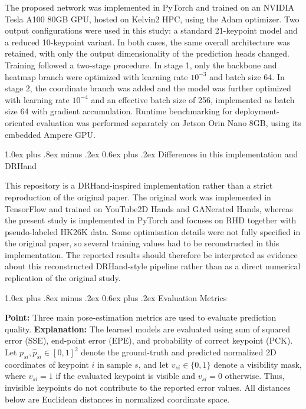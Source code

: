 \documentclass[10pt,letterpaper]{article}
\makeatletter
\renewcommand\subsection{\@startsection{subsection}{2}{\z@}%
  {1.0ex plus .8ex minus .2ex}%
  {0.6ex plus .2ex}%
  {\normalfont\itshape}}
\makeatother
\begin{document}
The proposed network was implemented in PyTorch and trained on an NVIDIA Tesla A100 80GB GPU, hosted on Kelvin2 HPC, using the Adam optimizer. Two output configurations were used in this study: a standard 21-keypoint model and a reduced 10-keypoint variant. In both cases, the same overall architecture was retained, with only the output dimensionality of the prediction heads changed. Training followed a two-stage procedure. In stage 1, only the backbone and heatmap branch were optimized with learning rate \(10^{-3}\) and batch size 64. In stage 2, the coordinate branch was added and the model was further optimized with learning rate \(10^{-4}\) and an effective batch size of 256, implemented as batch size 64 with gradient accumulation. Runtime benchmarking for deployment-oriented evaluation was performed separately on Jetson Orin Nano 8GB, using its embedded Ampere GPU.

\subsection{Differences in this implementation and DRHand}

\noindent This repository is a DRHand-inspired implementation rather than a strict reproduction of the original paper. The original work was implemented in TensorFlow and trained on YouTube2D Hands and GANerated Hands, whereas the present study is implemented in PyTorch and focuses on RHD together with pseudo-labeled HK26K data. Some optimisation details were not fully specified in the original paper, so several training values had to be reconstructed in this implementation. The reported results should therefore be interpreted as evidence about this reconstructed DRHand-style pipeline rather than as a direct numerical replication of the original study.


\subsection{Evaluation Metrics}

\noindent\textbf{Point:} Three main pose-estimation metrics are used to evaluate prediction quality.  
\textbf{Explanation:} The learned models are evaluated using sum of squared error (SSE), end-point error (EPE), and probability of correct keypoint (PCK). Let \(p_{si}, \hat{p}_{si} \in [0,1]^2\) denote the ground-truth and predicted normalized 2D coordinates of keypoint \(i\) in sample \(s\), and let \(v_{si} \in \{0,1\}\) denote a visibility mask, where \(v_{si}=1\) if the evaluated keypoint is visible and \(v_{si}=0\) otherwise. Thus, invisible keypoints do not contribute to the reported error values. All distances below are Euclidean distances in normalized coordinate space.
\end{document}

